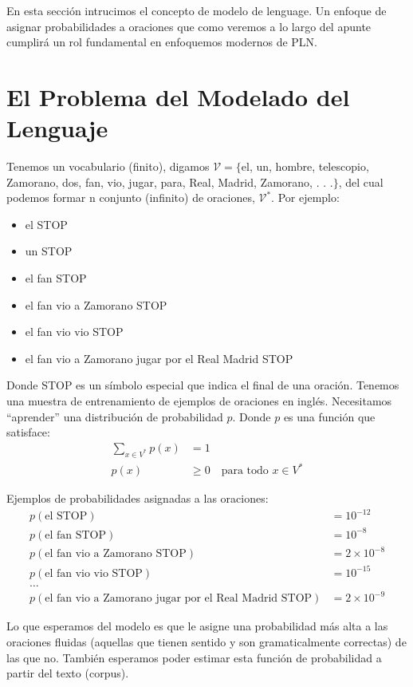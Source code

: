 En esta sección intrucimos el concepto de modelo de lenguage. Un enfoque de asignar probabilidades a oraciones que como veremos a lo largo del apunte cumplirá un rol fundamental en enfoquemos modernos de PLN.


\section{El Problema del Modelado del Lenguaje}

Tenemos un vocabulario (finito), digamos $\mathcal{V} = \{$el, un, hombre, telescopio, Zamorano, dos, fan, vio, jugar, para, Real, Madrid, Zamorano, . . .$\}$, del cual podemos formar n conjunto (infinito) de oraciones, $\mathcal{V}^*$.  Por ejemplo:
\begin{itemize}
\item el STOP
\item un STOP
\item el fan STOP
\item el fan vio a Zamorano STOP
\item el fan vio vio STOP
\item el fan vio a Zamorano jugar por el Real Madrid STOP
\end{itemize}

Donde STOP es un símbolo especial que indica el final de una oración. Tenemos una muestra de entrenamiento de ejemplos de oraciones en inglés. Necesitamos ``aprender'' una distribución de probabilidad $p$. Donde $p$ es una función que satisface:
\begin{align*}
\sum_{x\in V^*} p(x) &= 1 \\
p(x) &\geq 0 \quad \text{para todo } x \in V^*
\end{align*}

Ejemplos de probabilidades asignadas a las oraciones:
\begin{align*}
p(\text{el STOP}) &= 10^{-12} \\
p(\text{el fan STOP}) &= 10^{-8} \\
p(\text{el fan vio a Zamorano STOP}) &= 2 \times 10^{-8} \\
p(\text{el fan vio vio STOP}) &= 10^{-15} \\
\ldots \\
p(\text{el fan vio a Zamorano jugar por el Real Madrid STOP}) &= 2 \times 10^{-9}
\end{align*}

Lo que esperamos del modelo es que le asigne una probabilidad más alta a las oraciones fluidas (aquellas que tienen sentido y son gramaticalmente correctas) de las que no. También esperamos poder estimar esta función de probabilidad a partir del texto (corpus).

